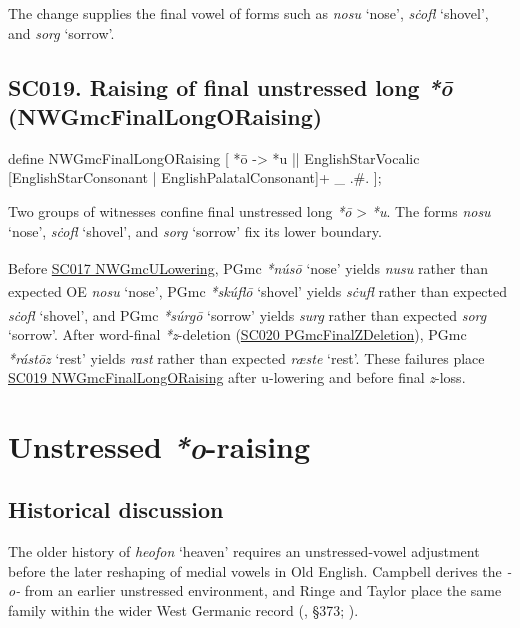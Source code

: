 \documentclass[
  british,
  a4paper,
  openany]{book}
\providecommand{\Pred}[1]{\textsuperscript{\dag}\emph{#1}}
\providecommand{\Recon}[1]{\emph{*#1}}
{\catcode`→=\active \global\def→{\ensuremath{\rightarrow}}}
\providecommand{\texorpdfstring}[2]{#1}
\DeclareRobustCommand{\CAPRRuleHeading}[2]{%
  #1\texorpdfstring{\\(#2)}{ (#2)}%
}
\providecommand{\Pred}[1]{\textsuperscript{\dag}\emph{#1}}
\providecommand{\Recon}[1]{\emph{*#1}}
{\catcode`→=\active \global\def→{\ensuremath{\rightarrow}}}
\begin{document}
The change supplies the final vowel of forms such as \emph{nosu} `nose',
\emph{sċofl} `shovel', and \emph{sorg} `sorrow'.

\subsection{\texorpdfstring{\CAPRRuleHeading{SC019. Raising of final unstressed long \emph{*ō}}{NWGmcFinalLongORaising}}{}}\label{rule-NWGmcFinalLongORaising}

\begin{ReaderFacingFoma}
define NWGmcFinalLongORaising [
    {*ō} -> {*u}
        || EnglishStarVocalic
           [EnglishStarConsonant | EnglishPalatalConsonant]+ _ .#.
];
\end{ReaderFacingFoma}

Two groups of witnesses confine final unstressed long \emph{*ō}
\textgreater{} \emph{*u}. The forms \emph{nosu} `nose', \emph{sċofl}
`shovel', and \emph{sorg} `sorrow' fix its lower boundary.

Before \hyperref[rule-NWGmcULowering]{SC017 NWGmcULowering}, PGmc
\Recon{núsō} `nose' yields \Pred{nusu} rather than expected OE
\emph{nosu} `nose', PGmc \Recon{skúflō} `shovel' yields \Pred{sċufl}
rather than expected \emph{sċofl} `shovel', and PGmc \Recon{súrgō}
`sorrow' yields \Pred{surg} rather than expected \emph{sorg} `sorrow'.
After word-final \emph{*z}-deletion
(\hyperref[rule-PGmcFinalZDeletion]{SC020 PGmcFinalZDeletion}), PGmc
\Recon{rástōz} `rest' yields \Pred{rast} rather than expected
\emph{ræste} `rest'. These failures place
\hyperref[rule-NWGmcFinalLongORaising]{SC019 NWGmcFinalLongORaising}
after u-lowering and before final \emph{z}-loss.

\newpage

\section{\texorpdfstring{Unstressed
\emph{*o}-raising}{Unstressed -raising}}\label{unstressed--raising}

\subsection{Historical discussion}\label{historical-discussion-14}

The older history of \emph{heofon} `heaven' requires an unstressed-vowel
adjustment before the later reshaping of medial vowels in Old English.
Campbell derives the \emph{-o-} from an earlier unstressed environment,
and Ringe and Taylor place the same family within the wider West
Germanic record (,
§373; ).
\end{document}
